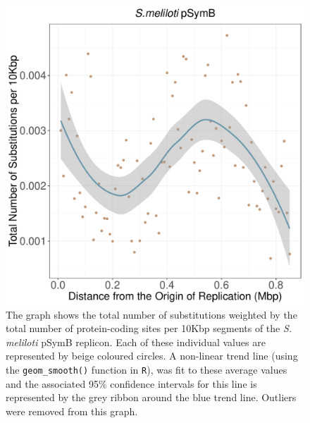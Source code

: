 \documentclass[11pt]{article}
\newcommand{\smel}{\textit{S.\,meliloti}\xspace}
\newcommand{\pb}{pSymB\xspace}
\begin{document}
\begin{figure}[h]
	\begin{center}
		\includegraphics[width=\textwidth]{./figs/pSymB_10KB_weighted_subs_nonpar_22Sep20.pdf}
		\caption{\label{fig:pSymB_nonpar}The graph shows the total number of substitutions weighted by the total number of protein-coding sites per 10Kbp segments of the \smel \pb replicon. Each of these individual values are represented by beige coloured circles. A non-linear trend line (using the \texttt{geom\_smooth()} function in \texttt{R}), was fit to these average values and the associated 95\% confidence intervals for this line is represented by the grey ribbon around the blue trend line. Outliers were removed from this graph.}
	\end{center}
\end{figure}
\end{document}
